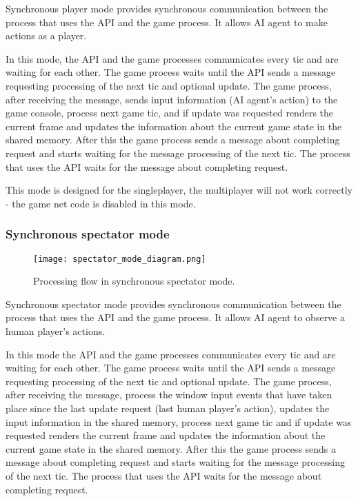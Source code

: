 	    Synchronous player mode provides synchronous communication between the process that uses the API and the game process. It allows AI agent to make actions as a player. 
	    
	    In this mode, the API and the game processes communicates every tic and are waiting for each other. The game process waits until the API sends a message requesting processing of the next tic and optional update. The game process, after receiving the message, sends input information (AI agent's action) to the game console, process next game tic, and if update was requested renders the current frame and updates the information about the current game state in the shared memory. After this the game process sends a message about completing request and starts waiting for the message processing of the next tic. The process that uses the API waits for the message about completing request.
	    
	    This mode is designed for the singleplayer, the multiplayer will not work correctly - the game net code is disabled in this mode.

    \subsubsection{Synchronous spectator mode}\label{sec:architecture_spectator_mode}

	    \begin{figure}
			    \centering
			    \texttt{[image: spectator\_mode\_diagram.png]}
			    \caption{Processing flow in synchronous spectator mode.}\label{fig:spectator_mode_diagram}
	    \end{figure}
	    
	    Synchronous spectator mode provides synchronous communication between the process that uses the API and the game process. It allows AI agent to observe a human player's actions. 
	    
	    In this mode the API and the game processes communicates every tic and are waiting for each other. The game process waits until the API sends a message requesting processing of the next tic and optional update. The game process, after receiving the message, process the window input events that have taken place since the last update request (last human player's action), updates the input information in the shared memory, process next game tic and if update was requested renders the current frame and updates the information about the current game state in the shared memory. After this the game process sends a message about completing request and starts waiting for the message processing of the next tic. The process that uses the API waits for the message about completing request.

